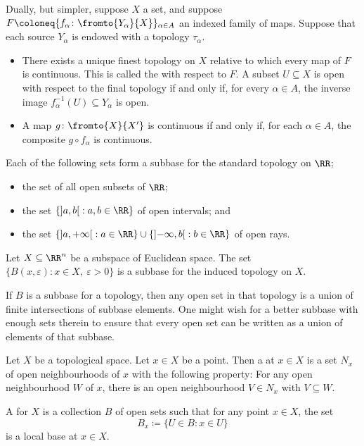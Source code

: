 \begin{nul}
	Dually, but simpler, suppose $X$ a set, and suppose $ F \coloneq \{ f_{\alpha} \colon \fromto{Y_{\alpha}}{X} \}_{\alpha\in A}$ an indexed family of maps.
	Suppose that each source $Y_{\alpha}$ is endowed with a topology $\tau_{\alpha}$.
	\begin{itemize}
		\item There exists a unique finest topology on $X$ relative to which every map of $F$ is continuous.
			This is called the  with respect to $F$.
			A subset $U \subseteq X$ is open with respect to the final topology if and only if, for every $\alpha \in A$, the inverse image $f_{\alpha}^{-1}(U) \subseteq Y_{\alpha}$ is open.
		\item A map $g\colon\fromto{X}{X'}$ is continuous if and only if, for each $\alpha\in A$, the composite $g\circ f_{\alpha}$ is continuous.
\end{itemize}
\end{nul}

\begin{exm}
	Each of the following sets form a subbase for the standard topology on $\RR$;
	\begin{itemize}
		\item the set of all open subsets of $\RR$;
		\item the set $\left\{\left]a,b\right[ : a,b\in\RR\right\}$ of open intervals; and
		\item the set $\left\{\left]a,+\infty\right[ : a\in\RR\}\cup\{\left]-\infty,b\right[ : b\in\RR\right\}$ of open rays.
	\end{itemize}
\end{exm}

\begin{exm}
	Let $X \subseteq \RR^n$ be a subspace of Euclidean space.
	The set $\{B(x,\varepsilon) : x\in X,\ \varepsilon>0\}$ is a subbase for the induced topology on $X$.
\end{exm}

If $B$ is a subbase for a topology, then any open set in that topology is a union of finite intersections of subbase elements.
One might wish for a better subbase with enough sets therein to ensure that every open set can be written as a union of elements of that subbase.

\begin{dfn}
	Let $X$ be a topological space. 
	Let $x\in X$ be a point.
	Then a  at $x\in X$ is a set $N_x$ of open neighbourhoods of $x$ with the following property:
	For any open neighbourhood $W$ of $x$, there is an open neighbourhood $V\in N_x$ with $V\subseteq W$.

	A  for $X$ is a collection $B$ of open sets such that for any point $x\in X$, the set
	\begin{equation*}
		B_x \coloneq \{ U\in B : x\in U \}
	\end{equation*}
	is a local base at $x\in X$.
\end{dfn}

